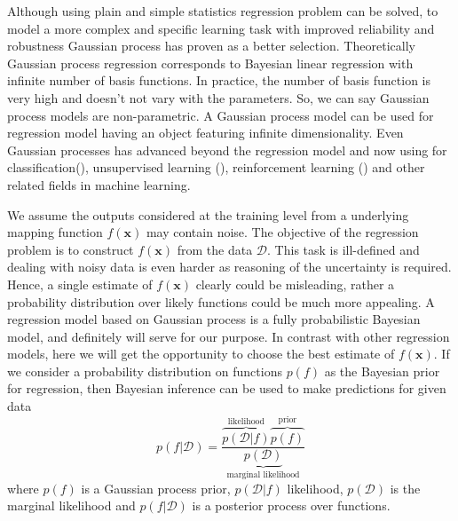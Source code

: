 Although using plain and simple statistics regression problem can be solved, to model a more complex and specific learning task with improved reliability and robustness Gaussian process has proven as a better selection. Theoretically Gaussian process regression corresponds to Bayesian linear regression with infinite number of basis functions. In practice, the number of basis function is very high and doesn't not vary with the parameters. So, we can say Gaussian process models are non-parametric. A Gaussian process model can be used for regression model having an object featuring infinite dimensionality. Even Gaussian processes has advanced beyond the regression model and now using for classification(\cite{Williams:1998, Nickisch:2008}), unsupervised learning (\cite{Ek:2008}), reinforcement learning (\cite{Deisenroth:2012}) and other related fields in machine learning.

We assume the outputs considered at the training level from a underlying mapping function $f(\textbf{x})$ may contain noise. The objective of the regression problem is to construct $f(\textbf{x})$ from the data $\mathcal{D}$. This task is ill-defined and dealing with noisy data is even harder as reasoning of the uncertainty is required. Hence, a single estimate of $f(\textbf{x})$ clearly could be misleading, rather a probability distribution over likely functions could be much more appealing. A regression model based on Gaussian process is a fully probabilistic Bayesian model, and definitely will serve for our purpose. In contrast with other regression models, here we will get the opportunity to choose the best estimate of $f(\textbf{x})$. If we consider a probability distribution on functions $p(f)$ as the Bayesian prior for regression, then Bayesian inference can be used to make predictions for given data 
\begin{equation} \label{eq:2.1}
p\left(f|\mathcal{D}\right)= \frac{\overbrace{p\left(\mathcal{D}|f\right)}^{\text{likelihood}}\overbrace{p\left(f\right)}^{\text {prior}}}{\underbrace{p\left(\mathcal{D}\right)}_{\text {marginal likelihood}}} 
\end{equation}
where $p\left(f\right)$ is a Gaussian process prior, $p\left(\mathcal{D}|f\right)$ likelihood, $p\left(\mathcal{D}\right)$ is the marginal likelihood and $p\left(f|\mathcal{D}\right)$ is a posterior process over functions.



